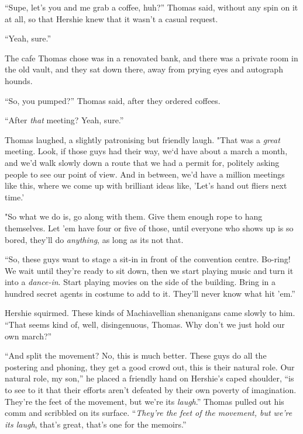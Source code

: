 ``Supe, let's you and me grab a coffee, huh?'' Thomas said, without
any spin on it at all, so that Hershie knew that it wasn't a casual
request.

``Yeah, sure.''

\tb

The cafe Thomas chose was in a renovated bank, and there was a
private room in the old vault, and they sat down there, away from
prying eyes and autograph hounds.

``So, you pumped?'' Thomas said, after they ordered coffees.

``After \emph{that} meeting? Yeah, sure.''

Thomas laughed, a slightly patronising but friendly laugh. "That
was a \emph{great} meeting. Look, if those guys had their way,
we`d have about a march a month, and we'd walk slowly down a route that we had 
a permit for, politely asking people to see our point of view. And in between, 
we'd have a million meetings like this, where we come up with brilliant ideas 
like, 'Let's hand out fliers next time.'

"So what we do is, go along with them. Give them enough rope to
hang themselves. Let 'em have four or five of those, until everyone
who shows up is so bored, they'll do \emph{anything}, as long as
its not that.

``So, these guys want to stage a sit-in in front of the convention centre. 
Bo-ring! We wait until they're ready to sit down, then we start playing music 
and turn it into a \emph{dance-in}. Start playing movies on the side of the 
building. Bring in a hundred secret agents in costume to add to it. They'll 
never know what hit 'em.''

Hershie squirmed. These kinds of Machiavellian shenanigans came
slowly to him.
``That seems kind of, well, disingenuous, Thomas. Why don't we just hold our 
own march?''

``And split the movement? No, this is much better. These guys do all the 
postering and phoning, they get a good crowd out, this is their natural role. 
Our natural role, my son,''
he placed a friendly hand on Hershie's caped shoulder,
``is to see to it that their efforts aren't defeated by their own poverty of 
imagination. They're the feet of the movement, but we're its \emph{laugh}.''
Thomas pulled out his comm and scribbled on its surface.
``\emph{They're the feet of the movement, but we're its laugh}, that's great, 
that's one for the memoirs.''

\tb

